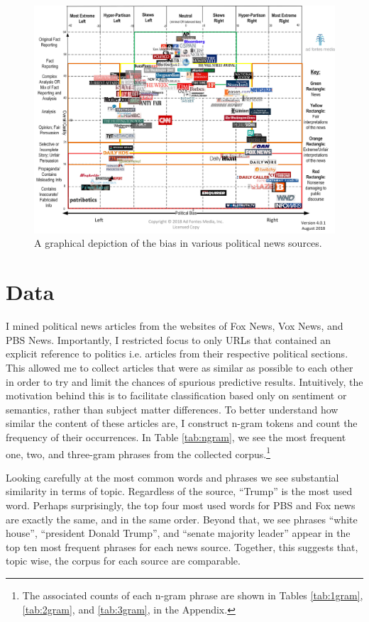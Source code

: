 \documentclass{article}
\begin{document}
		\begin{figure}[H]
			\includegraphics[width=\textwidth]{figures/images/news-bias.jpg}
			\caption{A graphical depiction of the bias in various political news sources.}
			\label{fig:news-bias}
		\end{figure}
		
	\section{Data}
	    I mined political news articles from the websites of Fox News, Vox News, and PBS News. Importantly, I restricted focus to only URLs that contained an explicit reference to politics i.e. articles from their respective political sections. This allowed me to collect articles that were as similar  as possible to each other in order to try and limit the chances of spurious predictive results. Intuitively, the motivation behind this is to facilitate classification based only on sentiment or semantics, rather than subject matter differences. To better understand how similar the content of these articles are, I construct n-gram tokens and count the frequency of their occurrences. In Table \ref{tab:ngram}, we see the most frequent one, two, and three-gram phrases from the collected corpus.\footnote{The associated counts of each n-gram phrase are shown in Tables \ref{tab:1gram}, \ref{tab:2gram}, and \ref{tab:3gram}, in the Appendix.}
	    
	     
	    
	    Looking carefully at the most common words and phrases we see substantial similarity in terms of topic. Regardless of the source, ``Trump'' is the most used word. Perhaps surprisingly, the top four most used words for PBS and Fox news are exactly the same, and in the same order. Beyond that, we see phrases ``white house'', ``president Donald Trump'', and ``senate majority leader'' appear in the top ten most frequent phrases for each news source. Together, this suggests that, topic wise, the corpus for each source are comparable. 
	    
\end{document}

